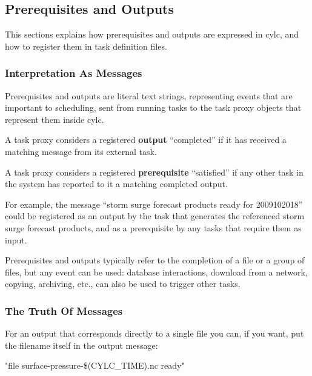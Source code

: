 \documentclass[11pt,a4paper]{article}
\begin{document}
\pagebreak
\subsection{Prerequisites and Outputs} 
\label{PrerequisitesandOutputs}


This sections explains how prerequisites and outputs are expressed in
cylc, and how to register them in task definition files.

\subsubsection{Interpretation As Messages} 

\begin{shaded}
    Prerequisites and outputs are literal text strings, representing
    events that are important to scheduling, sent from running tasks
    to the  task proxy objects that represent them inside cylc.
\end{shaded}

A task proxy considers a registered {\bf output} ``completed'' if it has
received a matching message from its external task.

A task proxy considers a registered {\bf prerequisite} ``satisfied'' if
any other task in the system has reported to it a matching completed
output.

For example, the message ``storm surge forecast products ready for
2009102018'' could be registered as an output by the task that generates
the referenced storm surge forecast products, and as a prerequisite by
any tasks that require them as input. 

Prerequisites and outputs typically refer to the completion of a file
or a group of files, but any event can be used: database interactions,
download from a network, copying, archiving, etc., can also be
used to trigger other tasks.

\subsubsection{The Truth Of Messages}

For an output that corresponds directly to a single file you can, if
you want, put the filename itself in the output message:
\begin{lstinline}
    "file surface-pressure-\$(CYLC_TIME).nc ready"
\end{lstinline}
\end{document}

